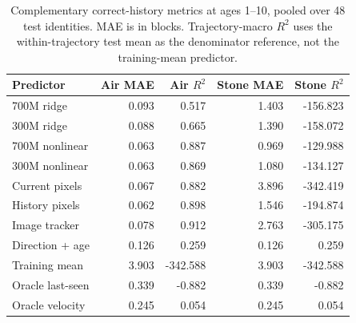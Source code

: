 \begin{table}[!htbp]\centering\small
\caption{Complementary correct-history metrics at ages 1--10, pooled over 48 test identities. MAE is in blocks. Trajectory-macro $R^2$ uses the within-trajectory test mean as the denominator reference, not the training-mean predictor.}
\begin{tabular}{@{}lrrrr@{}}\toprule Predictor & Air MAE & Air $R^2$ & Stone MAE & Stone $R^2$\\\midrule
700M ridge & 0.093 & 0.517 & 1.403 & -156.823\\
300M ridge & 0.088 & 0.665 & 1.390 & -158.072\\
700M nonlinear & 0.063 & 0.887 & 0.969 & -129.988\\
300M nonlinear & 0.063 & 0.869 & 1.080 & -134.127\\
Current pixels & 0.067 & 0.882 & 3.896 & -342.419\\
History pixels & 0.062 & 0.898 & 1.546 & -194.874\\
Image tracker & 0.078 & 0.912 & 2.763 & -305.175\\
Direction + age & 0.126 & 0.259 & 0.126 & 0.259\\
Training mean & 3.903 & -342.588 & 3.903 & -342.588\\
Oracle last-seen & 0.339 & -0.882 & 0.339 & -0.882\\
Oracle velocity & 0.245 & 0.054 & 0.245 & 0.054\\
\bottomrule\end{tabular}\end{table}
